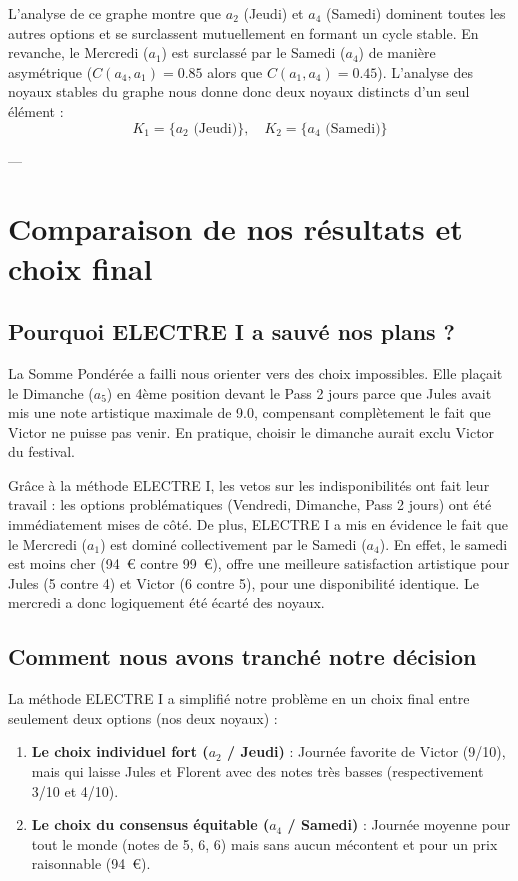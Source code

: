 \documentclass[11pt,a4paper]{article}
\begin{document}
L'analyse de ce graphe montre que $a_2$ (Jeudi) et $a_4$ (Samedi) dominent toutes les autres options et se surclassent mutuellement en formant un cycle stable. En revanche, le Mercredi ($a_1$) est surclassé par le Samedi ($a_4$) de manière asymétrique ($C(a_4, a_1)=0.85$ alors que $C(a_1, a_4)=0.45$). L'analyse des noyaux stables du graphe nous donne donc deux noyaux distincts d'un seul élément :
$$K_1 = \{a_2 \text{ (Jeudi)}\}, \quad K_2 = \{a_4 \text{ (Samedi)}\}$$

---

\section{Comparaison de nos résultats et choix final}
\label{sec:comparaison}

\subsection{Pourquoi ELECTRE I a sauvé nos plans ?}
La Somme Pondérée a failli nous orienter vers des choix impossibles. Elle plaçait le Dimanche ($a_5$) en 4ème position devant le Pass 2 jours parce que Jules avait mis une note artistique maximale de 9.0, compensant complètement le fait que Victor ne puisse pas venir. En pratique, choisir le dimanche aurait exclu Victor du festival. 

Grâce à la méthode ELECTRE I, les vetos sur les indisponibilités ont fait leur travail : les options problématiques (Vendredi, Dimanche, Pass 2 jours) ont été immédiatement mises de côté. De plus, ELECTRE I a mis en évidence le fait que le Mercredi ($a_1$) est dominé collectivement par le Samedi ($a_4$). En effet, le samedi est moins cher (94~€ contre 99~€), offre une meilleure satisfaction artistique pour Jules (5 contre 4) et Victor (6 contre 5), pour une disponibilité identique. Le mercredi a donc logiquement été écarté des noyaux.

\subsection{Comment nous avons tranché notre décision}
La méthode ELECTRE I a simplifié notre problème en un choix final entre seulement deux options (nos deux noyaux) :
\begin{enumerate}
    \item \textbf{Le choix individuel fort ($a_2$ / Jeudi)} : Journée favorite de Victor (9/10), mais qui laisse Jules et Florent avec des notes très basses (respectivement 3/10 et 4/10).
    \item \textbf{Le choix du consensus équitable ($a_4$ / Samedi)} : Journée moyenne pour tout le monde (notes de 5, 6, 6) mais sans aucun mécontent et pour un prix raisonnable (94~€).
\end{enumerate}
\end{document}
